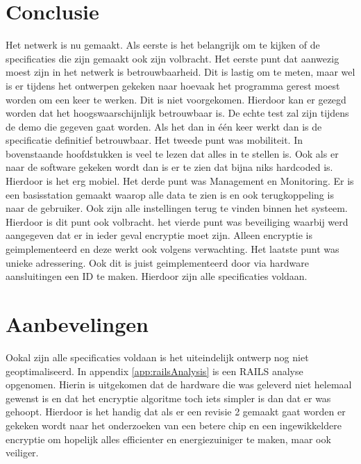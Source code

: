 \section{Conclusie}
Het netwerk is nu gemaakt. Als eerste is het belangrijk om te kijken of de specificaties die zijn gemaakt ook zijn volbracht.
Het eerste punt dat aanwezig moest zijn in het netwerk is betrouwbaarheid. Dit is lastig om te meten, maar wel is er tijdens het ontwerpen 
gekeken naar hoevaak het programma gerest moest worden om een keer te werken. Dit is niet voorgekomen. Hierdoor kan er gezegd worden dat 
het hoogswaarschijnlijk betrouwbaar is. De echte test zal zijn tijdens de demo die gegeven gaat worden. Als het dan in één keer werkt dan is 
de specificatie definitief betrouwbaar. Het tweede punt was mobiliteit. In bovenstaande hoofdstukken is veel te lezen dat alles in te stellen is.
Ook als er naar de software gekeken wordt dan is er te zien dat bijna niks hardcoded is. Hierdoor is het erg mobiel. Het derde punt was 
Management en Monitoring. Er is een basisstation gemaakt waarop alle data te zien is en ook terugkoppeling is naar de gebruiker. Ook zijn 
alle instellingen terug te vinden binnen het systeem. Hierdoor is dit punt ook volbracht. het vierde punt was beveiliging waarbij werd aangegeven 
dat er in ieder geval encryptie moet zijn. Alleen encryptie is geimplementeerd en deze werkt ook volgens verwachting. Het laatste punt was 
unieke adressering. Ook dit is juist geimplementeerd door via hardware aansluitingen een ID te maken. 
Hierdoor zijn alle specificaties voldaan.

\section{Aanbevelingen}
Ookal zijn alle specificaties voldaan is het uiteindelijk ontwerp nog niet geoptimaliseerd. In appendix \ref{app:railsAnalysis} is een RAILS 
analyse opgenomen. Hierin is uitgekomen dat de hardware die was geleverd niet helemaal gewenst is en dat het encryptie algoritme toch iets 
simpler is dan dat er was gehoopt. Hierdoor is het handig dat als er een revisie 2 gemaakt gaat worden er gekeken wordt naar  het onderzoeken van 
een betere chip en een ingewikkeldere encryptie om hopelijk alles efficienter en energiezuiniger te maken, maar ook veiliger.

